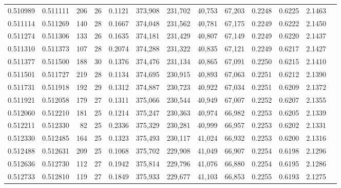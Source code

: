 \begin{tabular}{rrrrrrrrrrrrr}
0.510989 & 0.511111 &   206 &  26 &                                     0.1121 & 373,908 & 231,702 &  40,753 &  67,203 & 0.2248 & 0.6225 & 2.1463 \\
0.511114 & 0.511269 &   140 &  28 &                                     0.1667 & 374,048 & 231,562 &  40,781 &  67,175 & 0.2249 & 0.6222 & 2.1450 \\
0.511274 & 0.511306 &   133 &  26 &                                     0.1635 & 374,181 & 231,429 &  40,807 &  67,149 & 0.2249 & 0.6220 & 2.1437 \\
0.511310 & 0.511373 &   107 &  28 &                                     0.2074 & 374,288 & 231,322 &  40,835 &  67,121 & 0.2249 & 0.6217 & 2.1427 \\
0.511377 & 0.511500 &   188 &  30 &                                     0.1376 & 374,476 & 231,134 &  40,865 &  67,091 & 0.2250 & 0.6215 & 2.1410 \\
0.511501 & 0.511727 &   219 &  28 &                                     0.1134 & 374,695 & 230,915 &  40,893 &  67,063 & 0.2251 & 0.6212 & 2.1390 \\
0.511731 & 0.511918 &   192 &  29 &                                     0.1312 & 374,887 & 230,723 &  40,922 &  67,034 & 0.2251 & 0.6209 & 2.1372 \\
0.511921 & 0.512058 &   179 &  27 &                                     0.1311 & 375,066 & 230,544 &  40,949 &  67,007 & 0.2252 & 0.6207 & 2.1355 \\
0.512060 & 0.512210 &   181 &  25 &                                     0.1214 & 375,247 & 230,363 &  40,974 &  66,982 & 0.2253 & 0.6205 & 2.1339 \\
0.512211 & 0.512330 &    82 &  25 &                                     0.2336 & 375,329 & 230,281 &  40,999 &  66,957 & 0.2253 & 0.6202 & 2.1331 \\
0.512330 & 0.512485 &   164 &  25 &                                     0.1323 & 375,493 & 230,117 &  41,024 &  66,932 & 0.2253 & 0.6200 & 2.1316 \\
0.512488 & 0.512631 &   209 &  25 &                                     0.1068 & 375,702 & 229,908 &  41,049 &  66,907 & 0.2254 & 0.6198 & 2.1296 \\
0.512636 & 0.512730 &   112 &  27 &                                     0.1942 & 375,814 & 229,796 &  41,076 &  66,880 & 0.2254 & 0.6195 & 2.1286 \\
0.512733 & 0.512810 &   119 &  27 &                                     0.1849 & 375,933 & 229,677 &  41,103 &  66,853 & 0.2255 & 0.6193 & 2.1275 \\

\end{tabular}
